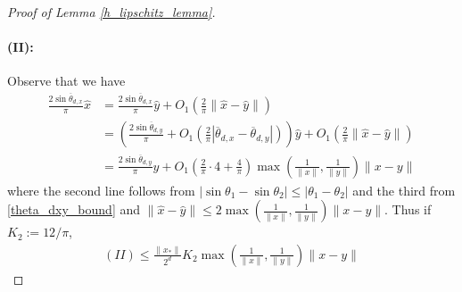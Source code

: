 \documentclass[11pt]{article}
\theoremstyle{remark}
\begin{document}
\begin{proof}[Proof of Lemma \ref{h_lipschitz_lemma}]
\paragraph{(II):} Observe that we have \begin{align*}
    \frac{2\sin \overline{\theta}_{d,x}}{\pi}\hat{x} & = \frac{2\sin \overline{\theta}_{d,x}}{\pi}\hat{y} + O_1\left(\frac{2}{\pi}\|\hat{x}-\hat{y}\|\right) \\
    & = \left(\frac{2\sin \overline{\theta}_{d,y}}{\pi} + O_1\left(\frac{2}{\pi}|\overline{\theta}_{d,x}-\overline{\theta}_{d,y}|\right)\right)\hat{y} + O_1\left(\frac{2}{\pi}\|\hat{x}-\hat{y}\|\right) \\
    & = \frac{2\sin \overline{\theta}_{d,y}}{\pi}\hat{y} + O_1\left(\frac{2}{\pi}\cdot4 + \frac{4}{\pi}\right)\max\left(\frac{1}{\|x\|},\frac{1}{\|y\|}\right)\|x-y\|
\end{align*}where the second line follows from $|\sin \theta_1 - \sin \theta_2| \leqslant|\theta_1-\theta_2|$ and the third from \eqref{theta_dxy_bound} and $\|\hat{x}-\hat{y}\| \leqslant 2\max\left(\frac{1}{\|x\|},\frac{1}{\|y\|}\right)\|x-y\|$. Thus if $K_2 := 12/\pi$, \begin{align}
(II) \leqslant \frac{\|x_*\|}{2^d}K_2\max\left(\frac{1}{\|x\|},\frac{1}{\|y\|}\right)\|x-y\| \label{II_bound}
\end{align}


\end{proof}
\end{document}
